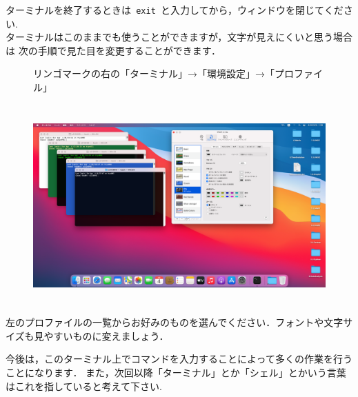 \documentclass{jarticle}
\begin{document}
ターミナルを終了するときは\verb| exit |と入力してから，ウィンドウを閉じてください.\\

ターミナルはこのままでも使うことができますが，文字が見えにくいと思う場合は
次の手順で見た目を変更することができます．
\begin{figure}[H]
  \centering
  リンゴマークの右の「ターミナル」→「環境設定」→「プロファイル」\\
  \ \\
  \includegraphics[height=7.5cm]{fig/MacTerminalSetting.png}
\end{figure}
左のプロファイルの一覧からお好みのものを選んでください．フォントや文字サイズも見やすいものに変えましょう．

今後は，このターミナル上でコマンドを入力することによって多くの作業を行うことになります．
また，次回以降「ターミナル」とか「シェル」とかいう言葉はこれを指していると考えて下さい.\\ 

\end{document}
